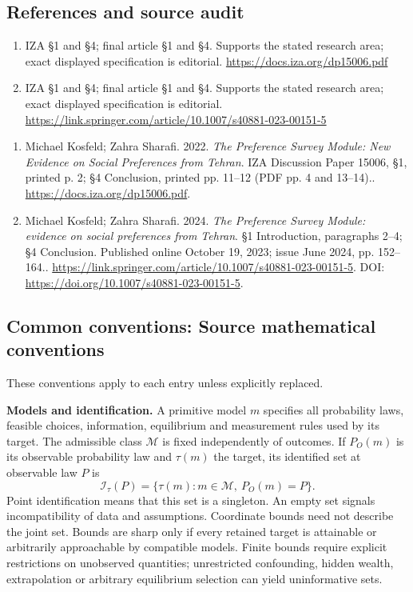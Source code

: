 \documentclass[11pt,a4paper]{article}
\begin{document}
\subsection*{References and source audit}
\begin{enumerate}
\item IZA §1 and §4; final article §1 and §4. Supports the stated research area; exact displayed specification is editorial. \url{https://docs.iza.org/dp15006.pdf}
\item IZA §1 and §4; final article §1 and §4. Supports the stated research area; exact displayed specification is editorial. \url{https://link.springer.com/article/10.1007/s40881-023-00151-5}
\end{enumerate}
\begin{enumerate}\raggedright
\item\hypertarget{definitions:source:30007585:1}{} Michael Kosfeld; Zahra Sharafi. 2022. \emph{The Preference Survey Module: New Evidence on Social Preferences from Tehran}. IZA Discussion Paper 15006, §1, printed p. 2; §4 Conclusion, printed pp. 11–12 (PDF pp. 4 and 13–14)..
\url{https://docs.iza.org/dp15006.pdf}.
\item\hypertarget{definitions:source:30007585:2}{} Michael Kosfeld; Zahra Sharafi. 2024. \emph{The Preference Survey Module: evidence on social preferences from Tehran}. §1 Introduction, paragraphs 2–4; §4 Conclusion. Published online October 19, 2023; issue June 2024, pp. 152–164..
\url{https://link.springer.com/article/10.1007/s40881-023-00151-5}.
DOI: \url{https://doi.org/10.1007/s40881-023-00151-5}.
\end{enumerate}

\subsection*{Common conventions: Source mathematical conventions}

These conventions apply to each entry unless explicitly replaced.

\textbf{Models and identification.} A primitive model \(m\) specifies all probability laws, feasible choices, information, equilibrium and measurement rules used by its target. The admissible class \(\mathcal M\) is fixed independently of outcomes. If \(P_O(m)\) is its observable probability law and \(\tau(m)\) the target, its identified set at observable law \(P\) is
\[
 \mathcal I_\tau(P)=\{\tau(m):m\in\mathcal M,\ P_O(m)=P\}.
\]
Point identification means that this set is a singleton. An empty set signals incompatibility of data and assumptions. Coordinate bounds need not describe the joint set. Bounds are sharp only if every retained target is attainable or arbitrarily approachable by compatible models. Finite bounds require explicit restrictions on unobserved quantities; unrestricted confounding, hidden wealth, extrapolation or arbitrary equilibrium selection can yield uninformative sets.
\end{document}
